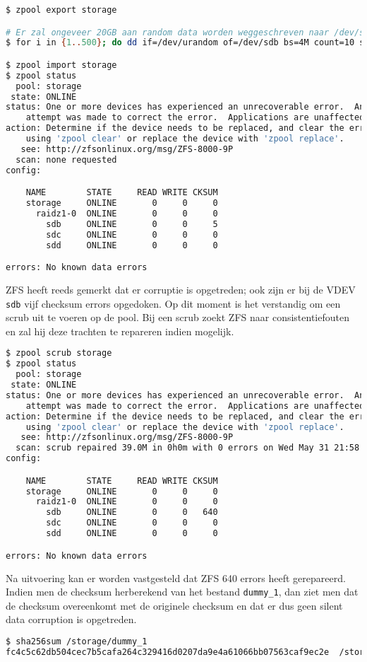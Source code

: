 \begin{lstlisting}[language=bash,style=command_style]
$ zpool export storage

# Er zal ongeveer 20GB aan random data worden weggeschreven naar /dev/sdb
$ for i in {1..500}; do dd if=/dev/urandom of=/dev/sdb bs=4M count=10 seek=1; sleep 1; done

$ zpool import storage
$ zpool status
  pool: storage
 state: ONLINE
status: One or more devices has experienced an unrecoverable error.  An
	attempt was made to correct the error.  Applications are unaffected.
action: Determine if the device needs to be replaced, and clear the errors
	using 'zpool clear' or replace the device with 'zpool replace'.
   see: http://zfsonlinux.org/msg/ZFS-8000-9P
  scan: none requested
config:

	NAME        STATE     READ WRITE CKSUM
	storage     ONLINE       0     0     0
	  raidz1-0  ONLINE       0     0     0
	    sdb     ONLINE       0     0     5
	    sdc     ONLINE       0     0     0
	    sdd     ONLINE       0     0     0

errors: No known data errors
\end{lstlisting}

ZFS heeft reeds gemerkt dat er corruptie is opgetreden; ook zijn er bij de VDEV \texttt{sdb} vijf checksum errors opgedoken. Op dit moment is het verstandig om een scrub uit te voeren op de pool. Bij een scrub zoekt ZFS naar consistentiefouten en zal hij deze trachten te repareren indien mogelijk.

\begin{lstlisting}[language=bash,style=command_style]
$ zpool scrub storage
$ zpool status 
  pool: storage
 state: ONLINE
status: One or more devices has experienced an unrecoverable error.  An
	attempt was made to correct the error.  Applications are unaffected.
action: Determine if the device needs to be replaced, and clear the errors
	using 'zpool clear' or replace the device with 'zpool replace'.
   see: http://zfsonlinux.org/msg/ZFS-8000-9P
  scan: scrub repaired 39.0M in 0h0m with 0 errors on Wed May 31 21:58:32 2017
config:

	NAME        STATE     READ WRITE CKSUM
	storage     ONLINE       0     0     0
	  raidz1-0  ONLINE       0     0     0
	    sdb     ONLINE       0     0   640
	    sdc     ONLINE       0     0     0
	    sdd     ONLINE       0     0     0

errors: No known data errors
\end{lstlisting}

Na uitvoering kan er worden vastgesteld dat ZFS 640 errors heeft gerepareerd. Indien men de checksum herberekend van het bestand \texttt{dummy\_1}, dan ziet men dat de checksum overeenkomt met de originele checksum en dat er dus geen silent data corruption is opgetreden.

\begin{lstlisting}[language=bash,style=command_style]
$ sha256sum /storage/dummy_1
fc4c5c62db504cec7b5cafa264c329416d0207da9e4a61066bb07563caf9ec2e  /storage/dummy_1
\end{lstlisting}
